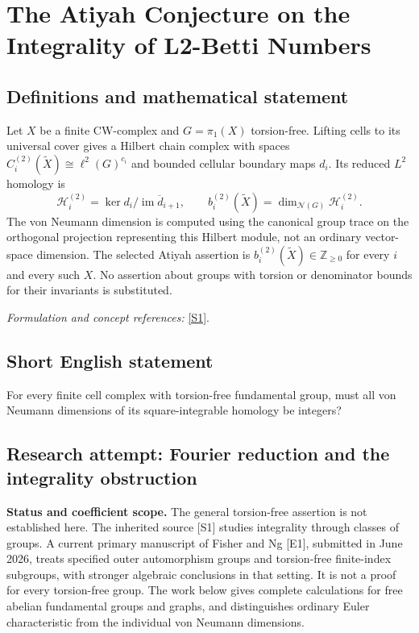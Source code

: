 \documentclass[11pt]{article}
\begin{document}
\section*{\texorpdfstring{The Atiyah Conjecture on the Integrality of L2-Betti Numbers}{The Atiyah Conjecture on the Integrality of L2-Betti Numbers}}\label{334}
\subsection{Definitions and mathematical statement}
Let $X$ be a finite CW-complex and $G=\pi_1(X)$ torsion-free. Lifting cells to its universal cover gives a Hilbert chain complex with spaces $C_i^{(2)}(\widetilde X)\cong\ell^2(G)^{c_i}$ and bounded cellular boundary maps $d_i$. Its reduced $L^2$ homology is
\[
 \mathcal H_i^{(2)}=\ker d_i\big/\overline{\operatorname{im}d_{i+1}},
 \qquad b_i^{(2)}(\widetilde X)=\dim_{\mathcal N(G)}\mathcal H_i^{(2)}.
\]
The von Neumann dimension is computed using the canonical group trace on the orthogonal projection representing this Hilbert module, not an ordinary vector-space dimension. The selected Atiyah assertion is $b_i^{(2)}(\widetilde X)\in{\mathbb{Z}}_{\ge0}$ for every $i$ and every such $X$. No assertion about groups with torsion or denominator bounds for their invariants is substituted.
\par\smallskip\textit{Formulation and concept references:} \href{https://arxiv.org/abs/math/0001101}{[S1]}.

\subsection{Short English statement}
For every finite cell complex with torsion-free fundamental group, must all von Neumann dimensions of its square-integrable homology be integers?
\subsection{Research attempt: Fourier reduction and the integrality obstruction}
\textbf{Status and coefficient scope.} The general torsion-free assertion is not established here. The inherited source [S1] studies integrality through classes of groups. A current primary manuscript of Fisher and Ng [E1], submitted in June 2026, treats specified outer automorphism groups and torsion-free finite-index subgroups, with stronger algebraic conclusions in that setting. It is not a proof for every torsion-free group. The work below gives complete calculations for free abelian fundamental groups and graphs, and distinguishes ordinary Euler characteristic from the individual von Neumann dimensions.
\end{document}
